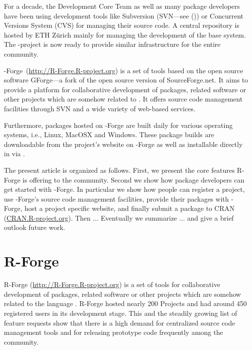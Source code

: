 For a decade, the \R{} Development Core Team as well as many
\R{} package developers have been using
development tools like Subversion (SVN---see (\cite{subversion07})) or
Concurrent Versions System 
(CVS) for managing their source code. 
A central repository is hosted by ETH Z\"urich mainly for
managing the development of the base \R{} system. The
\R{}-project is now ready to provide similar infrastructure
for the entire \R{} community.

\R{}-Forge~(\url{http://R-Forge.R-project.org}) is a set of tools based
on the open source software GForge---a fork of
the open source version of SourceForge.net.
It aims to provide a platform for collaborative development of
\R{} packages, \R{} 
related software or other projects which are somehow related to \R{}.
It offers source code management facilities through SVN and
a wide variety of web-based services.

Furthermore, packages hosted on \R{}-Forge are built daily
for  various operating systems, i.e., Linux, MacOSX and Windows. These
package builds are downloadable from the 
project's website on \R{}-Forge as well as installable 
directly in \R{} via .

The present article is organized as follows. First, we present the core
features R-Forge is offering to the \R{} community. Second we
show how package developers can get started with 
\R{}-Forge. In particular we show how people can register a project, 
use \R{}-Forge's source code management facilities, provide their
packages with \R{}-Forge, host a project specific website, and
finally submit a package to CRAN (\url{CRAN.R-project.org}). Then ...
Eventually we summarize ... and give a brief outlook future work.


\section{R-Forge}
R-Forge (\url{http://R-Forge.R-project.org}) is a set of tools for
collaborative development of \R{} packages, \R{}
related software or other projects which are somehow related to the
language \R{}. R-Forge hosted nearly 200 Projects and had around 450
registered users in its development stage. This and the steadily growing list of
feature requests show that there is a high demand for centralized source code
management tools and for releasing prototype code frequently among the
\R{} community.

